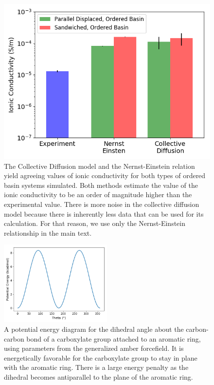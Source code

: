\documentclass{article}
\begin{document}
  \begin{figure}[!htb]
        \centering
        \includegraphics[width=0.5\linewidth]{Ionic_conductivity.png}
        \caption{The Collective Diffusion model and the Nernst-Einstein relation yield
        agreeing values of ionic conductivity for both types of ordered basin systems 
        simulated. Both methods estimate the value of the ionic conductivity to be an 
        order of magnitude higher than the experimental value. There is more noise in
        the collective diffusion model because there is inherently less data that 
        can be used for its calculation. For that reason, we use only the Nernst-Einstein relationship in the main text.}
        \label{fig:conductivity}
  \end{figure}
  
  \begin{figure}[!htb]
  \centering
  \includegraphics[width=0.5\textwidth]{carboxylate_dihedral_rb.png}
  \caption{A potential energy diagram for the dihedral angle about the carbon-carbon bond of
  a carboxylate group attached to an aromatic ring, using parameters from the generalized amber 
  forcefield. It is energetically favorable for the carboxylate group to stay in plane with 
  the aromatic ring. There is a large energy penalty as the dihedral becomes antiparallel to 
  the plane of the aromatic ring.}\label{fig:carboxylate_dihedral_rb}
  \end{figure}
  
\end{document}
